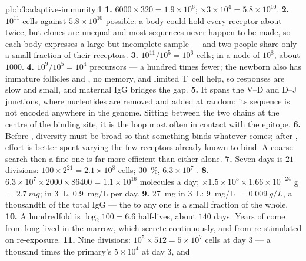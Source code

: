 \begin{solution}{pb:b3:adaptive-immunity:1}
\textbf{1.} $6000\times 320 = 1.9\times 10^{6}$; $\times 3\times 10^{4}
= 5.8\times 10^{10}$.
\textbf{2.} $10^{11}$ cells against $5.8\times 10^{10}$ possible: a body
could hold every receptor about twice, but clones are unequal and most
sequences never happen to be made, so each body expresses a large but
incomplete sample --- and two people share only a small fraction of
their receptors.
\textbf{3.} $10^{11}/10^{5} = 10^{6}$ cells; in a node of $10^{8}$,
about $1000$.
\textbf{4.} $10^{9}/10^{5} = 10^{4}$ precursors --- a hundred times fewer;
the newborn also has immature follicles and , no
memory, and limited T~cell help, so responses are slow and small, and
maternal IgG bridges the gap.
\textbf{5.} It spans the V--D and D--J junctions, where nucleotides are
removed and added at random: its sequence is not encoded anywhere in
the genome. Sitting between the two chains at the centre of the
binding site, it is the loop most often in contact with the epitope.
\textbf{6.} Before , diversity must be broad so that something
binds whatever comes; after , effort is better spent varying
the few receptors already known to bind. A coarse search then a fine
one is far more efficient than either alone.
\textbf{7.} Seven days is $21$ divisions: $100\times 2^{21} = 2.1\times
10^{8}$ cells; \qty{30}{\%}, $6.3\times 10^{7}$ .
\textbf{8.} $6.3\times 10^{7}\times 2000\times \num{86400} = 1.1\times
10^{16}$ molecules a day; $\times 1.5\times 10^{5}\times 1.66\times
10^{-24}$ g $= \qty{2.7}{mg}$; in \qty{3}{L}, \qty{0.9}{mg/L} per day.
\textbf{9.} \qty{27}{mg} in \qty{3}{L}: \qty{9}{mg/L} $= \qty{0.009}{g/L}$,
a thousandth of the total IgG --- the  to any one  is a
small fraction of the whole.
\textbf{10.} A hundredfold is $\log_{2}100 = 6.6$ half-lives, about
$140$ days. Years of  come from long-lived  in the
marrow, which secrete continuously, and from  re-stimulated
on re-exposure.
\textbf{11.} Nine divisions: $10^{5}\times 512 = 5\times 10^{7}$ cells at
day 3 --- a thousand times the primary's $5\times 10^{4}$ at day 3, and

\end{solution}
